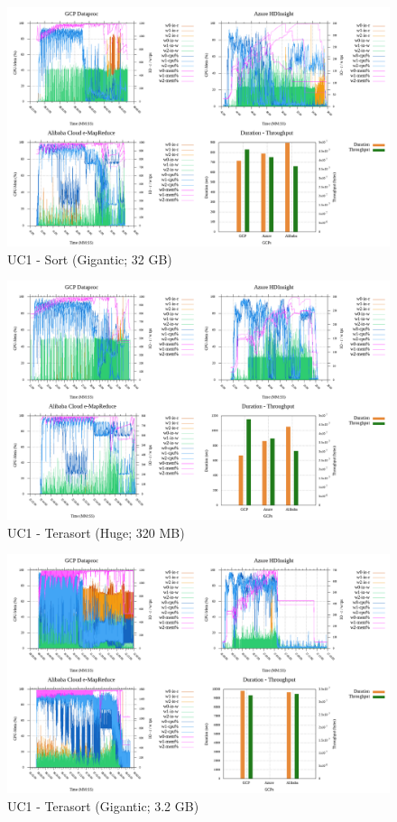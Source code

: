 \documentclass[review]{elsarticle}
\begin{document}
\begin{figure}[p]
	\caption{UC1 - Sort (Gigantic; 32 GB)}
	\label{fig:uc1-srt-g-cmidt}
	\includegraphics[width=\textwidth]{uc1-srt-g-cmidt}
	\centering
\end{figure}

\begin{figure}[p]
	\caption{UC1 - Terasort (Huge; 320 MB)}
	\label{fig:uc1-tera-h-cmidt}
	\includegraphics[width=\textwidth]{uc1-tera-h-cmidt}
	\centering
\end{figure}

\begin{figure}[p]
	\caption{UC1 - Terasort (Gigantic; 3.2 GB)}
	\label{fig:uc1-tera-g-cmidt}
	\includegraphics[width=\textwidth]{uc1-tera-g-cmidt}
	\centering
\end{figure}
\end{document}
